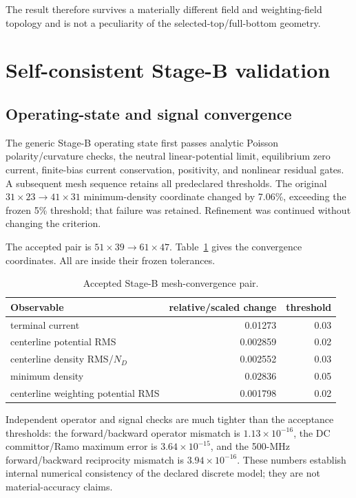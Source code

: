 \documentclass[11pt]{article}
\begin{document}
The result therefore survives a materially different field and weighting-field topology and is not a peculiarity of the selected-top/full-bottom geometry.

\section{Self-consistent Stage-B validation}

\subsection{Operating-state and signal convergence}

The generic Stage-B operating state first passes analytic Poisson polarity/curvature checks, the neutral linear-potential limit, equilibrium zero current, finite-bias current conservation, positivity, and nonlinear residual gates. A subsequent mesh sequence retains all predeclared thresholds. The original $31\times23\rightarrow41\times31$ minimum-density coordinate changed by 7.06\%, exceeding the frozen 5\% threshold; that failure was retained. Refinement was continued without changing the criterion.

The accepted pair is $51\times39\rightarrow61\times47$. Table~\ref{tab:stagebmesh} gives the convergence coordinates. All are inside their frozen tolerances.

\begin{table}[H]
\centering
\caption{Accepted Stage-B mesh-convergence pair.}
\label{tab:stagebmesh}
\begin{tabular}{lrr}
\toprule
Observable & relative/scaled change & threshold\\
\midrule
terminal current & 0.01273 & 0.03\\
centerline potential RMS & 0.002859 & 0.02\\
centerline density RMS/$N_D$ & 0.002552 & 0.03\\
minimum density & 0.02836 & 0.05\\
centerline weighting potential RMS & 0.001798 & 0.02\\
\bottomrule
\end{tabular}
\end{table}

Independent operator and signal checks are much tighter than the acceptance thresholds: the forward/backward operator mismatch is $1.13\times10^{-16}$, the DC committor/Ramo maximum error is $3.64\times10^{-15}$, and the 500-MHz forward/backward reciprocity mismatch is $3.94\times10^{-16}$. These numbers establish internal numerical consistency of the declared discrete model; they are not material-accuracy claims.
\end{document}
